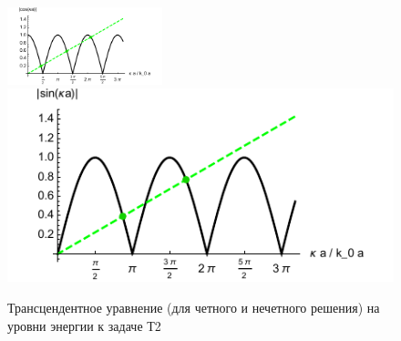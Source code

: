 \begin{figure}[ht]
    \centering
    \includegraphics[width=0.4\textwidth]{figures/T2_1.pdf}
    \hspace{5 mm} 
    \includegraphics{figures/T2_2.pdf}
    \caption{Трансцендентное уравнение (для четного и нечетного решения) на уровни энергии к задаче Т2}
    \label{fig:T2}
\end{figure}
